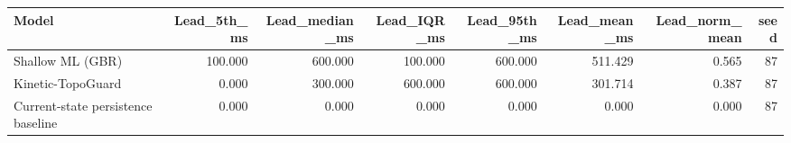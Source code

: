 \begin{tabular}{lrrrrrrr}
\toprule
Model & Lead\_5th\_ms & Lead\_median\_ms & Lead\_IQR\_ms & Lead\_95th\_ms & Lead\_mean\_ms & Lead\_norm\_mean & seed \\
\midrule
Shallow ML (GBR) & 100.000 & 600.000 & 100.000 & 600.000 & 511.429 & 0.565 & 87 \\
Kinetic-TopoGuard & 0.000 & 300.000 & 600.000 & 600.000 & 301.714 & 0.387 & 87 \\
Current-state persistence baseline & 0.000 & 0.000 & 0.000 & 0.000 & 0.000 & 0.000 & 87 \\
\bottomrule
\end{tabular}
